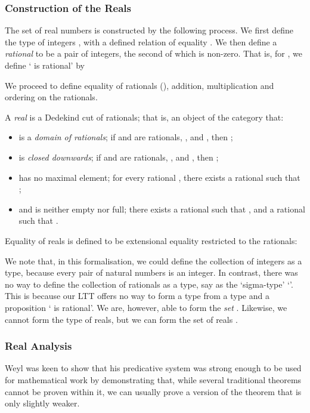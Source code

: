 \documentclass[acmtocl]{acmtrans2m}
\begin{document}
\subsubsection{Construction of the Reals}

The set of real numbers is constructed by the following process. We
first define the type of integers , with a defined relation of equality .
We then define a
\emph{rational} to be a pair of integers, the second of which is non-zero.  That is, for , we define ` is rational' by

We proceed to define equality of rationals (), addition, multiplication and ordering on the rationals.

A \emph{real} is a Dedekind cut of rationals; that is, an object 
of the category  that:
\begin{itemize}
\item
is a \emph{domain of rationals}; if  and  are rationals, , and , then ;
\item
is \emph{closed downwards}; if  and  are rationals, , and , then ;
\item
has no maximal element; for every rational , there exists a rational  such that ;
\item
and is neither empty nor full; there exists a rational  such that , and a rational  such that .
\end{itemize}
Equality of reals is defined to be extensional equality restricted to the rationals:


We note that, in this formalisation, we could define the collection of integers as a type, because every pair of natural numbers is an integer.  In contrast,
there was no way to define the collection of rationals as a type, say as the `sigma-type' `'.  This is because our LTT offers no way to form a type from a type  and a proposition ` is rational'.  We are, however,  able to form the \emph{set} .  Likewise, we cannot form the type of reals, but we can form the set of reals .

\subsubsection{Real Analysis}

Weyl was keen to show that his predicative system was strong enough to be used for mathematical work by demonstrating that, while several traditional theorems cannot be proven within it, we can usually prove a version of the theorem that is only slightly weaker.
\end{document}
